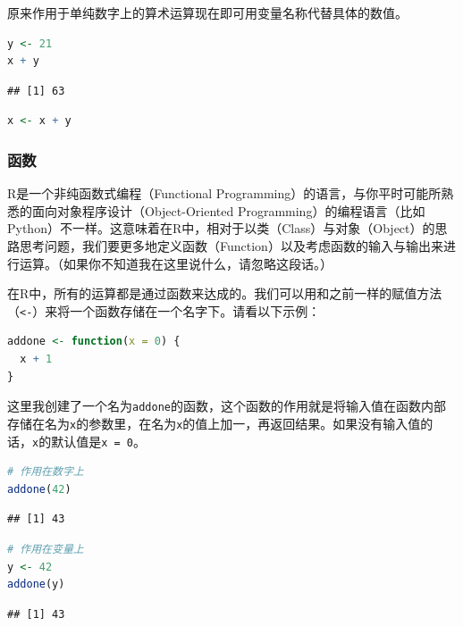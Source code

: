 \documentclass[]{ctexbook}
\newcommand{\passthrough}[1]{#1}
\begin{document}
原来作用于单纯数字上的算术运算现在即可用变量名称代替具体的数值。

\begin{lstlisting}[language=R]
y <- 21
x + y
\end{lstlisting}

\begin{lstlisting}
## [1] 63
\end{lstlisting}

\begin{lstlisting}[language=R]
x <- x + y
\end{lstlisting}

\hypertarget{ux51fdux6570}{%
\subsubsection{函数}\label{ux51fdux6570}}

R是一个非纯函数式编程（Functional Programming）的语言，与你平时可能所熟悉的面向对象程序设计（Object-Oriented Programming）的编程语言（比如 Python）不一样。这意味着在R中，相对于以类（Class）与对象（Object）的思路思考问题，我们要更多地定义函数（Function）以及考虑函数的输入与输出来进行运算。（如果你不知道我在这里说什么，请忽略这段话。）

在R中，所有的运算都是通过函数来达成的。我们可以用和之前一样的赋值方法（\passthrough{\lstinline!<-!}）来将一个函数存储在一个名字下。请看以下示例：

\begin{lstlisting}[language=R]
addone <- function(x = 0) {
  x + 1
}
\end{lstlisting}

这里我创建了一个名为\passthrough{\lstinline!addone!}的函数，这个函数的作用就是将输入值在函数内部存储在名为\passthrough{\lstinline!x!}的参数里，在名为\passthrough{\lstinline!x!}的值上加一，再返回结果。如果没有输入值的话，\passthrough{\lstinline!x!}的默认值是\passthrough{\lstinline!x = 0!}。

\begin{lstlisting}[language=R]
# 作用在数字上
addone(42)
\end{lstlisting}

\begin{lstlisting}
## [1] 43
\end{lstlisting}

\begin{lstlisting}[language=R]
# 作用在变量上
y <- 42
addone(y)
\end{lstlisting}

\begin{lstlisting}
## [1] 43
\end{lstlisting}
\end{document}

